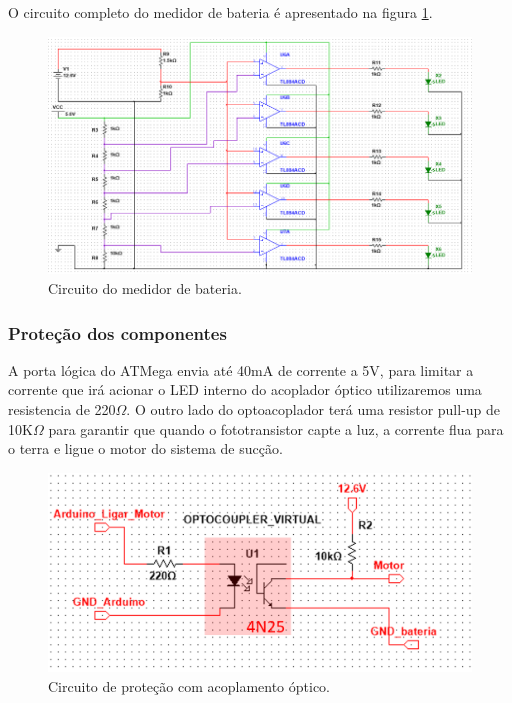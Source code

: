 		O circuito completo do medidor de bateria é apresentado na figura \ref{img:medidor_de_bateria}.

		\begin{figure}[H]
			\centering
			\includegraphics[scale=0.7]{figuras/Med_bateria.png}
			\caption{Circuito do medidor de bateria.}
			\label{img:medidor_de_bateria}
		\end{figure}

		\subsubsection{Proteção dos componentes}
		\label{sub:Proteção_dos_componentes_2}
		A porta lógica do ATMega envia até 40mA de corrente a 5V, para limitar a corrente que irá acionar o LED interno do acoplador óptico utilizaremos uma resistencia de 220$\Omega$. O outro lado do optoacoplador  terá uma resistor pull-up de 10K$\Omega$ para garantir que quando o fototransistor capte a luz, a corrente flua para o terra e ligue o motor do sistema de sucção.

		\begin{figure}[H]
			\centering
			\includegraphics[scale=0.4]{figuras/simulacao_optacoplador.png}
			\caption{Circuito de proteção com acoplamento óptico.}
			\label{img:circuito_de_proteção}
		\end{figure}

